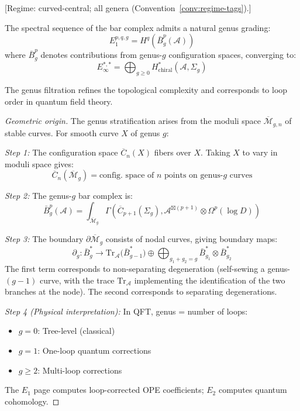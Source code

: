 \begin{theorem}\label{thm:ss-genus-stratification}
\textup{[Regime: curved-central; all genera
\textup{(}Convention~\textup{\ref{conv:regime-tags})}.]}

The spectral sequence of the bar complex admits a natural genus grading:
\[E_1^{p,q,g} = H^q\left(\bar{B}^p_g(\mathcal{A})\right)\]
where $\bar{B}^p_g$ denotes contributions from genus-$g$ configuration spaces, converging to:
\[E_\infty^{*,*} = \bigoplus_{g \geq 0} H^*_{\text{chiral}}(\mathcal{A}, \Sigma_g)\]

The genus filtration refines the topological complexity and corresponds to loop order 
in quantum field theory.
\end{theorem}

\begin{proof}[Geometric origin]
The genus stratification arises from the moduli space $\overline{\mathcal{M}}_{g,n}$ of 
stable curves. For smooth curve $X$ of genus $g$:

\emph{Step 1:} The configuration space $\overline{C}_n(X)$ fibers over $X$. Taking $X$ 
to vary in moduli space gives:
\[\overline{C}_n(\overline{\mathcal{M}}_g) = \text{config. space of } n \text{ points on genus-}g \text{ curves}\]

\emph{Step 2:} The genus-$g$ bar complex is:
\[\bar{B}^p_g(\mathcal{A}) = \int_{\overline{\mathcal{M}}_g} \Gamma(\overline{C}_{p+1}(\Sigma_g), 
\mathcal{A}^{\boxtimes (p+1)} \otimes \Omega^p(\log D))\]

\emph{Step 3:} The boundary $\partial \overline{\mathcal{M}}_g$ consists of nodal curves, 
giving boundary maps:
\[\partial_g: \bar{B}^*_g \to \mathrm{Tr}_{\mathcal{A}}\!\bigl(\bar{B}^*_{g-1}\bigr) \oplus \bigoplus_{g_1+g_2=g} \bar{B}^*_{g_1} \otimes \bar{B}^*_{g_2}\]
The first term corresponds to non-separating degeneration (self-sewing a genus-$(g-1)$ curve, with the trace $\mathrm{Tr}_{\mathcal{A}}$ implementing the identification of the two branches at the node).  The second corresponds to separating degenerations.

\emph{Step 4 (Physical interpretation):} In QFT, genus = number of loops:
\begin{itemize}
\item $g=0$: Tree-level (classical)
\item $g=1$: One-loop quantum corrections
\item $g \geq 2$: Multi-loop corrections
\end{itemize}

The $E_1$ page computes loop-corrected OPE coefficients; $E_2$ computes quantum cohomology.
\end{proof}

